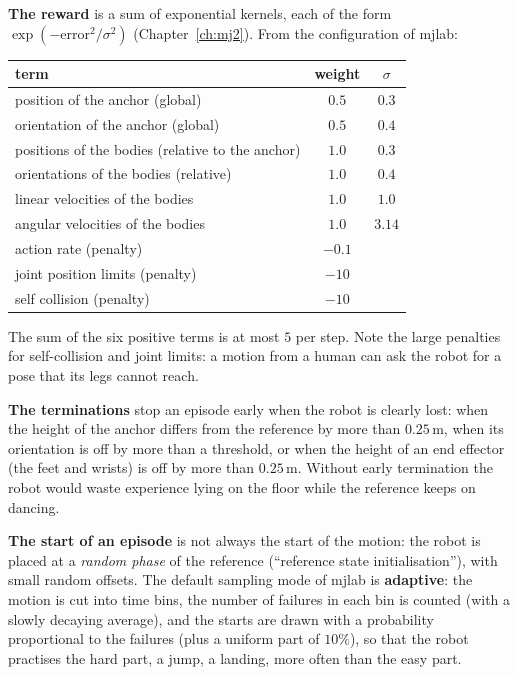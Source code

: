 \textbf{The reward} is a sum of exponential kernels, each of the form $\exp(-\text{error}^2/\sigma^2)$ (Chapter~\ref{ch:mj2}). From the configuration of mjlab:
\begin{center}
\small
\begin{tabular}{lcc}
\hline
term & weight & $\sigma$\\
\hline
position of the anchor (global) & $0.5$ & $0.3$\\
orientation of the anchor (global) & $0.5$ & $0.4$\\
positions of the bodies (relative to the anchor) & $1.0$ & $0.3$\\
orientations of the bodies (relative) & $1.0$ & $0.4$\\
linear velocities of the bodies & $1.0$ & $1.0$\\
angular velocities of the bodies & $1.0$ & $3.14$\\
action rate (penalty) & $-0.1$ & \\
joint position limits (penalty) & $-10$ & \\
self collision (penalty) & $-10$ & \\
\hline
\end{tabular}
\end{center}
The sum of the six positive terms is at most $5$ per step. Note the large penalties for self-collision and joint limits: a motion from a human can ask the robot for a pose that its legs cannot reach.

\textbf{The terminations} stop an episode early when the robot is clearly lost: when the height of the anchor differs from the reference by more than $0.25$\,m, when its orientation is off by more than a threshold, or when the height of an end effector (the feet and wrists) is off by more than $0.25$\,m. Without early termination the robot would waste experience lying on the floor while the reference keeps on dancing.

\textbf{The start of an episode} is not always the start of the motion: the robot is placed at a \emph{random phase} of the reference (``reference state initialisation''), with small random offsets. The default sampling mode of mjlab is \textbf{adaptive}: the motion is cut into time bins, the number of failures in each bin is counted (with a slowly decaying average), and the starts are drawn with a probability proportional to the failures (plus a uniform part of $10\%$), so that the robot practises the hard part, a jump, a landing, more often than the easy part.


